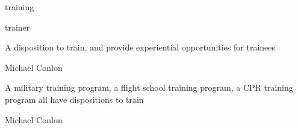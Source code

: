 \documentclass[letterpaper,10pt,english]{sphinxmanual}
\begin{document}
\begin{sphinxShadowBox}

\sphinxAtStartPar
training
\end{sphinxShadowBox}

\begin{sphinxShadowBox}

\sphinxAtStartPar
trainer
\end{sphinxShadowBox}

\begin{sphinxShadowBox}

\sphinxAtStartPar
{\hyperref[\detokenize{doc-BFO_0000016::doc}]{}}
\end{sphinxShadowBox}

\begin{sphinxShadowBox}

\sphinxAtStartPar
A disposition to train, and provide experiential opportunities for trainees
\end{sphinxShadowBox}

\begin{sphinxShadowBox}

\sphinxAtStartPar
Michael Conlon 
\end{sphinxShadowBox}

\begin{sphinxShadowBox}

\sphinxAtStartPar
A military training program, a flight school training program, a CPR training program all have dispositions to train
\end{sphinxShadowBox}

\begin{sphinxShadowBox}

\sphinxAtStartPar
Michael Conlon 
\end{sphinxShadowBox}
\begin{quote}

\ignorespaces \end{quote}
\end{document}

